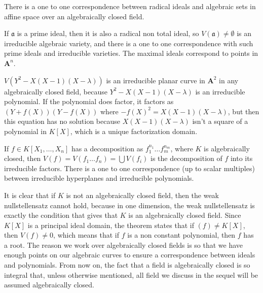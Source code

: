 \begin{corollary}
    There is a one to one correspondence between radical ideals and algebraic sets in affine space over an algebraically closed field.
\end{corollary}

\begin{corollary}
    If $\mathfrak{a}$ is a prime ideal, then it is also a radical non total ideal, so $V(\mathfrak{a}) \neq \emptyset$ is an irreducible algebraic variety, and there is a one to one correspondence with such prime ideals and irreducible varieties. The maximal ideals correspond to points in $\mathbf{A}^n$.
\end{corollary}

\begin{example}
    $V(Y^2 - X(X-1)(X-\lambda))$ is an irreducible planar curve in $\mathbf{A}^2$ in any algebraically closed field, because $Y^2 - X(X-1)(X-\lambda)$ is an irreducible polynomial. If the polynomial does factor, it factors as $(Y + f(X))(Y - f(X))$ where $-f(X)^2 = X(X-1)(X-\lambda)$, but then this equation has no solution because $X(X-1)(X-\lambda)$ isn't a square of a polynomial in $K[X]$, which is a unique factorization domain.
\end{example}

\begin{corollary}
    If $f \in K[X_1, \dots, X_n]$ has a decomposition as $f_1^{n_1} \dots f_m^{n_m}$, where $K$ is algebraically closed, then $V(f) = V(f_1 \dots f_n) = \bigcup V(f_i)$ is the decomposition of $f$ into its irreducible factors. There is a one to one correspondence (up to scalar multiples) between irreducible hyperplanes and irreducible polynomials.
\end{corollary}

It is clear that if $K$ is not an algebraically closed field, then the weak nullstellensatz cannot hold, because in one dimension, the weak nullstellensatz is exactly the condition that gives that $K$ is an algebraically closed field. Since $K[X]$ is a principal ideal domain, the theorem states that if $(f) \neq K[X]$, then $V(f) \neq 0$, which means that if $f$ is a non constant polynomial, then $f$ has a root.  The reason we work over algebraically closed fields is so that we have enough points on our algebraic curves to ensure a correspondence between ideals and polynomials. From now on, the fact that a field is algebraically closed is so integral that, unless otherwise mentioned, all field we discuss in the sequel will be assumed algebraically closed.


